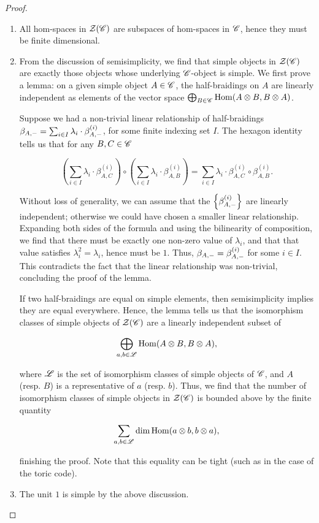 \documentclass{article}
\theoremstyle{definition}
\numberwithin{figure}{section}
\begin{document}
\begin{proof}
\begin{enumerate}
\item All hom-spaces in $\mathcal{Z}(\mathscr{C})$ are subspaces of hom-spaces in $\mathscr{C}$, hence they must be finite dimensional.

\item From the discussion of semisimplicity, we find that simple objects in $\mathcal{Z}(\mathscr{C})$ are exactly those objects whose underlying $\mathscr{C}$-object is simple. We first prove a lemma: on a given simple object $A\in \mathscr{C}$, the half-braidings on $A$ are linearly independent as elements of the vector space $\bigoplus_{B\in \mathscr{C}}\mathrm{Hom}(A\otimes B, B\otimes A)$.

Suppose we had a non-trivial linear relationship of half-braidings $\beta_{A,\--}=\sum_{i\in I}\lambda_i \cdot \beta^{(i)}_{A,\--}$, for some finite indexing set $I$. The hexagon identity tells us that for any $B,C\in \mathscr{C}$

$$\left(\sum_{i\in I}\lambda_i\cdot \beta_{A,C}^{(i)}\right)\circ \left(\sum_{i\in I}\lambda_i\cdot \beta_{A,B}^{(i)}\right)=\sum_{i\in I}\lambda_i \cdot \beta_{A,C}^{(i)}\circ \beta_{A,B}^{(i)}.$$

Without loss of generality, we can assume that the $\left\{\beta_{A,\--}^{(i)}\right\}$ are linearly independent; otherwise we could have chosen a smaller linear relationship. Expanding both sides of the formula and using the bilinearity of composition, we find that there must be exactly one non-zero value of $\lambda_i$, and that that value satisfies $\lambda_i^2=\lambda_i$, hence must be $1$. Thus, $\beta_{A,\--}=\beta^{(i)}_{A,\--}$ for some $i\in I$. This contradicts the fact that the linear relationship was non-trivial, concluding the proof of the lemma.

If two half-braidings are equal on simple elements, then semisimplicity implies they are equal everywhere. Hence, the lemma tells us that the isomorphism classes of simple objects of $\mathcal{Z}(\mathscr{C})$ are a linearly independent subset of

$$\bigoplus_{a,b\in \mathscr{L}}\mathrm{Hom}(A\otimes B,B\otimes A),$$

where $\mathscr{L}$ is the set of isomorphism classes of simple objects of $\mathscr{C}$, and $A$ (resp. $B$) is a representative of $a$ (resp. $b$). Thus, we find that the number of isomorphism classes of simple objects in $\mathcal{Z}(\mathscr{C})$ is bounded above by the finite quantity

$$\sum_{a,b\in \mathscr{L}}\dim \mathrm{Hom}(a\otimes b,b\otimes a),$$

finishing the proof. Note that this equality can be tight (such as in the case of the toric code).

\item The unit $1$ is simple by the above discussion.
\end{enumerate}

\end{proof}
\end{document}
